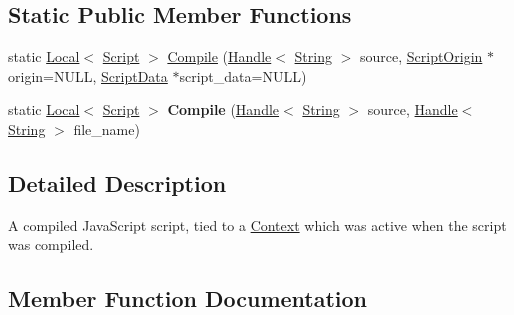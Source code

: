 \subsection*{Static Public Member Functions}
\begin{DoxyCompactItemize}
\item 
static \hyperlink{classv8_1_1_local}{Local}$<$ \hyperlink{classv8_1_1_script}{Script} $>$ \hyperlink{classv8_1_1_script_a88f982e927836c082d8f462047355268}{Compile} (\hyperlink{classv8_1_1_handle}{Handle}$<$ \hyperlink{classv8_1_1_string}{String} $>$ source, \hyperlink{classv8_1_1_script_origin}{Script\+Origin} $\ast$origin=N\+U\+L\+L, \hyperlink{classv8_1_1_script_data}{Script\+Data} $\ast$script\+\_\+data=N\+U\+L\+L)
\item 
\hypertarget{classv8_1_1_script_ae420c65d6315f3ef8e83e79c17231f4e}{}static \hyperlink{classv8_1_1_local}{Local}$<$ \hyperlink{classv8_1_1_script}{Script} $>$ {\bfseries Compile} (\hyperlink{classv8_1_1_handle}{Handle}$<$ \hyperlink{classv8_1_1_string}{String} $>$ source, \hyperlink{classv8_1_1_handle}{Handle}$<$ \hyperlink{classv8_1_1_string}{String} $>$ file\+\_\+name)\label{classv8_1_1_script_ae420c65d6315f3ef8e83e79c17231f4e}

\end{DoxyCompactItemize}


\subsection{Detailed Description}
A compiled Java\+Script script, tied to a \hyperlink{classv8_1_1_context}{Context} which was active when the script was compiled. 

\subsection{Member Function Documentation}
\hypertarget{classv8_1_1_script_a88f982e927836c082d8f462047355268}{}
